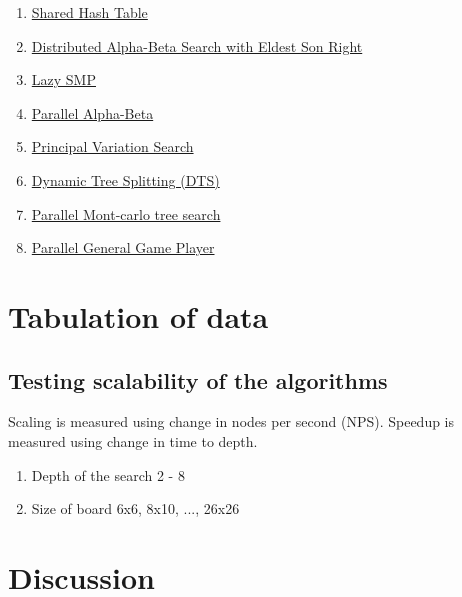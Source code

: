 \documentclass[12pt]{article}
\begin{document}
\begin{enumerate}
  \item \href{https://chessprogramming.wikispaces.com/Shared+Hash+Table}{Shared Hash Table}
  \item \href{https://chessprogramming.wikispaces.com/ABDADA}{Distributed Alpha-Beta Search with Eldest Son Right}
  \item \href{https://chessprogramming.wikispaces.com/Lazy+SMP}{Lazy SMP}
  \item \href{http://www.netlib.org/utk/lsi/pcwLSI/text/node350.html}{Parallel Alpha-Beta}
  \item
    \href{https://chessprogramming.wikispaces.com/Principal+Variation+Search}{Principal
    Variation Search}
  \item
    \href{https://chessprogramming.wikispaces.com/Dynamic+Tree+Splitting}{Dynamic
    Tree Splitting (DTS)}
  \item
    \href{https://dke.maastrichtuniversity.nl/m.winands/documents/multithreadedMCTS2.pdf}{Parallel
    Mont-carlo tree search}
  \item \href{http://www.lamsade.dauphine.fr/~cazenave/papers/rootparallelggp.pdf}{Parallel General Game Player}
\end{enumerate}


\section{Tabulation of data}

\subsection{Testing scalability of the algorithms}

Scaling is measured using change in nodes per second (NPS). Speedup is measured
using change in time to depth.

\begin{enumerate}
  \item Depth of the search {2 - 8}
  \item Size of board {6x6, 8x10, ..., 26x26}
\end{enumerate}


\section{Discussion}




\end{document}
